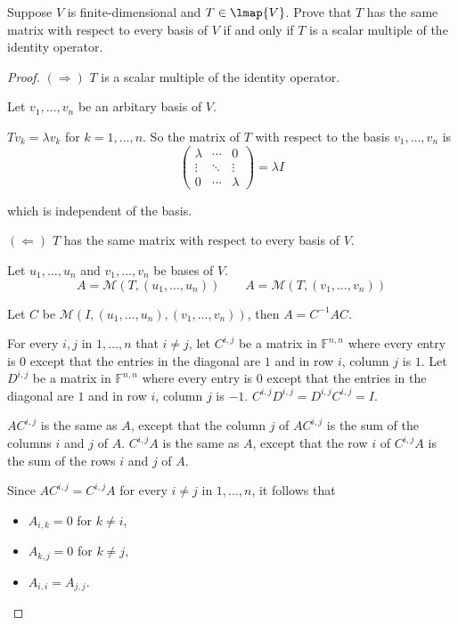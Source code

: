 \begin{exercise}
    Suppose $V$ is finite-dimensional and $T \in \lmap{V}$. Prove that $T$ has the same matrix with respect to every basis of $V$ if and only if $T$ is a scalar multiple of the identity operator.
\end{exercise}

\begin{proof}
    $(\Rightarrow)$ $T$ is a scalar multiple of the identity operator.

    Let $v_{1}, \ldots, v_{n}$ be an arbitary basis of $V$.

    $Tv_{k} = \lambda v_{k}$ for $k = 1,\ldots, n$. So the matrix of $T$ with respect to the basis $v_{1}, \ldots, v_{n}$ is
    \[
        \begin{pmatrix}
            \lambda & \cdots & 0       \\
            \vdots  & \ddots & \vdots  \\
            0       & \cdots & \lambda
        \end{pmatrix} = \lambda I
    \]

    which is independent of the basis.

    $(\Leftarrow)$ $T$ has the same matrix with respect to every basis of $V$.

    Let $u_{1}, \ldots, u_{n}$ and $v_{1}, \ldots, v_{n}$ be bases of $V$.
    \[
        A = \mathcal{M}(T, (u_{1}, \ldots, u_{n})) \qquad A = \mathcal{M}(T, (v_{1}, \ldots, v_{n}))
    \]

    Let $C$ be $\mathcal{M}(I, (u_{1}, \ldots, u_{n}), (v_{1}, \ldots, v_{n}))$, then $A = C^{-1}AC$.

    For every $i,j$ in $1,\ldots, n$ that $i\ne j$, let $C^{i,j}$ be a matrix in $\mathbb{F}^{n,n}$ where every entry is $0$ except that the entries in the diagonal are $1$ and in row $i$, column $j$ is $1$. Let $D^{i,j}$ be a matrix in $\mathbb{F}^{n,n}$ where every entry is $0$ except that the entries in the diagonal are $1$ and in row $i$, column $j$ is $-1$. $C^{i,j}D^{i,j} = D^{i,j}C^{i,j} = I$.

    $AC^{i,j}$ is the same as $A$, except that the column $j$ of $AC^{i,j}$ is the sum of the columns $i$ and $j$ of $A$. $C^{i,j}A$ is the same as $A$, except that the row $i$ of $C^{i,j}A$ is the sum of the rows $i$ and $j$ of $A$.

    Since $AC^{i,j} = C^{i,j}A$ for every $i\ne j$ in $1,\ldots, n$, it follows that
    \begin{itemize}
        \item $A_{i,k} = 0$ for $k\ne i$,
        \item $A_{k,j} = 0$ for $k\ne j$,
        \item $A_{i,i} = A_{j,j}$.
    \end{itemize}


\end{proof}
